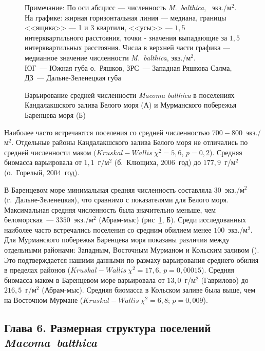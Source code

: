 {\begin{figure}[ht]
\begin{minipage}[]{.48\linewidth}
\begin{center}
	\end{center}
	\end{minipage}
	\hfill
	\caption{Варьирование средней численности {\it Macoma balthica} в поселениях Кандалакшского залива Белого моря (А) и Мурманского побережья Баренцева моря (Б)}
	{\footnotesize Примечание: По оси абсцисс --- численность {\it M.~balthica}, ~экз./м$^2$.\\
	На графике: жирная горизонтальная линия --- медиана, границы <<ящика>> --- 1 и 3 квартили, <<усы>> --- $1,5$ интерквартильного расстояния, точки - значения выпадающие за $1,5$ интерквартильных расстояния.
Числа в верхней части графика --- медианное значение численности {\it M.~balthica}, экз./м$^2$.\\
 ЮГ~--- Южная губа о.~Ряшков, ЗРС~--- Западная Ряшкова Салма, ДЗ~--- Дальне-Зеленецкая губа}
	\label{ris:N_area}
	\end{figure}

Наиболее часто встречаются поселения со средней численностью $700-800$~экз./м$^2$.
Отдельные районы Кандалакшского залива Белого моря не отличались по средней численности маком ($Kruskal-Wallis\ \chi^2 = 5,6$, $p = 0,2$).
Средняя биомасса варьировала от $1,1$~г/м$^2$ (б.~Клющиха, $2006$~год) до $177,9$~г/м$^2$ (о.~Горелый, $2004$~год).

В Баренцевом море минимальная средняя численность составляла $30$~экз./м$^2$ (г.~Дальне-Зеленецкая), что сравнимо с показателями для Белого моря. 
Максимальная средняя численность была значительно меньше, чем беломорская~--- $3350$~экз./м$^2$ (Абрам-мыс) (рис~\ref{ris:N_area}, Б).
Среди исследованных наиболее часто встречались поселения со средним обилием менее $100$~экз./м$^2$.
Для Мурманского побережья Баренцева моря показаны различия между отдельными районами: Западным, Восточным Мурманом и Кольским заливом (\cite{Guryanova_Ushakov_1929, Guryanova_et_al_1930}). 
Это подтверждается нашими данными по размаху варьирования среднего обилия в пределах районов ($Kruskal-Wallis\ \chi^2 = 17,6$, $p = 0,00015$).
Средняя биомасса маком в Баренцевом море варьировала от $13,0$~г/м$^2$ (Гаврилово) до $216,5$~г/м$^2$ (Абрам-мыс). 
Средняя биомасса в Кольском заливе была выше, чем на Восточном Мурмане ($Kruskal-Wallis~\chi^2 = 6,8$; $p = 0,009$).



\subsection*{Глава 6. Размерная структура поселений \textit{Macoma~balthica}}

}
